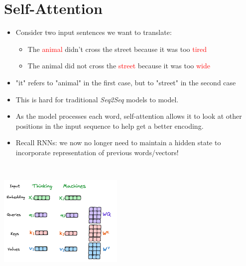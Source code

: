 \documentclass{article}
\begin{document}
\section{Self-Attention}
\begin{itemize}
    \item Consider two input sentences we want to translate:
    \begin{itemize}
        \item The \textcolor{red}{animal} didn't cross the street because it was too \textcolor{red}{tired}
        \item The animal did not cross the  \textcolor{red}{street} because it was too \textcolor{red}{wide}
    \end{itemize}
    \item "it" refers to "animal" in the first case, but to "street" in the second case
    \item This is hard for traditional \textit{Seq2Seq} models to model.
    \item As the model processes each word, self-attention allows it to look at other positions in the input sequence to help get a better encoding. 
    \item Recall RNNs: we now no longer need to maintain a hidden state to incorporate representation of previous words/vectors!
\end{itemize}
\begin{minipage}{0.5\textwidth}
\includegraphics[width=6cm, height=6cm]{Transformer/Images/SelfAttention1.png}
\end{minipage}
\end{document}
